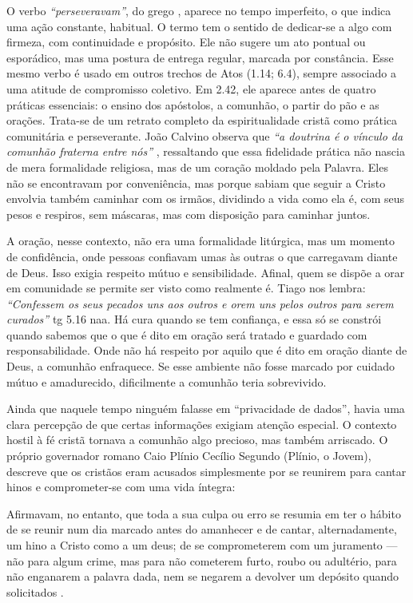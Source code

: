 O verbo \textit{``perseveravam''}, do grego \textit{}, aparece no tempo imperfeito, o que indica uma ação constante, habitual. O termo tem o sentido de dedicar-se a algo com firmeza, com continuidade e propósito. Ele não sugere um ato pontual ou esporádico, mas uma postura de entrega regular, marcada por constância. Esse mesmo verbo é usado em outros trechos de Atos (1.14; 6.4), sempre associado a uma atitude de compromisso coletivo. Em 2.42, ele aparece antes de quatro práticas essenciais: o ensino dos apóstolos, a comunhão, o partir do pão e as orações. Trata-se de um retrato completo da espiritualidade cristã como prática comunitária e perseverante. João Calvino observa que \textit{``a doutrina é o vínculo da comunhão fraterna entre nós''} \cite{calvinoAtos2}, ressaltando que essa fidelidade prática não nascia de mera formalidade religiosa, mas de um coração moldado pela Palavra. Eles não se encontravam por conveniência, mas porque sabiam que seguir a Cristo envolvia também caminhar com os irmãos, dividindo a vida como ela é, com seus pesos e respiros, sem máscaras, mas com disposição para caminhar juntos.

A oração, nesse contexto, não era uma formalidade litúrgica, mas um momento de confidência, onde pessoas confiavam umas às outras o que carregavam diante de Deus. Isso exigia respeito mútuo e sensibilidade. Afinal, quem se dispõe a orar em comunidade se permite ser visto como realmente é. Tiago nos lembra: \textit{``Confessem os seus pecados uns aos outros e orem uns pelos outros para serem curados''} \gls{tg} 5.16 \gls{naa}. Há cura quando se tem confiança, e essa só se constrói quando sabemos que o que é dito em oração será tratado e guardado com responsabilidade. Onde não há respeito por aquilo que é dito em oração diante de Deus, a comunhão enfraquece. Se esse ambiente não fosse marcado por cuidado mútuo e amadurecido, dificilmente a comunhão teria sobrevivido.

Ainda que naquele tempo ninguém falasse em “privacidade de dados”, havia uma clara percepção de que certas informações exigiam atenção especial. O contexto hostil à fé cristã tornava a comunhão algo precioso, mas também arriscado. O próprio governador romano Caio Plínio Cecílio Segundo (Plínio, o Jovem), descreve que os cristãos eram acusados simplesmente por se reunirem para cantar hinos e comprometer-se com uma vida íntegra:

\begin{citacao}
    Afirmavam, no entanto, que toda a sua culpa ou erro se resumia em ter o hábito de se reunir num dia marcado antes do amanhecer e de cantar, alternadamente, um hino a Cristo como a um deus; de se comprometerem com um juramento — não para algum crime, mas para não cometerem furto, roubo ou adultério, para não enganarem a palavra dada, nem se negarem a devolver um depósito quando solicitados \cite[p.~272]{plinioCartasX}.
\end{citacao}

